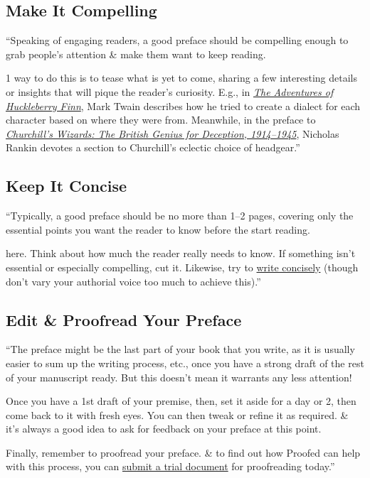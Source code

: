 \documentclass[oneside]{book}
\numberwithin{equation}{section}
\begin{document}
\subsection{Make It Compelling}
``Speaking of engaging readers, a good preface should be compelling enough to grab people's attention \& make them want to keep reading.

1 way to do this is to tease what is yet to come, sharing a few interesting details or insights that will pique the reader's curiosity. E.g., in \href{https://www.britannica.com/topic/Adventures-of-Huckleberry-Finn-novel-by-Twain}{\textit{The Adventures of Huckleberry Finn}}, Mark Twain describes how he tried to create a dialect for each character based on where they were from. Meanwhile, in the preface to \href{https://www.amazon.co.uk/dp/B002RI90B8/ref=dp-kindle-redirect?_encoding=UTF8&btkr=1}{\textit{Churchill's Wizards: The British Genius for Deception, 1914--1945}}, Nicholas Rankin devotes a section to Churchill's eclectic choice of headgear.''

\subsection{Keep It Concise}
``Typically, a good preface should be no more than 1--2 pages, covering only the essential points you want the reader to know before the start reading.

 here. Think about how much the reader really needs to know. If something isn't essential or especially compelling, cut it. Likewise, try to \href{https://proofed.co.uk/writing-tips/how-to-write-concisely/}{write concisely} (though don't vary your authorial voice too much to achieve this).''

\subsection{Edit \& Proofread Your Preface}
``The preface might be the last part of your book that you write, as it is usually easier to sum up the writing process, etc., once you have a strong draft of the rest of your manuscript ready. But this doesn't mean it warrants any less attention!

Once you have a 1st draft of your premise, then, set it aside for a day or 2, then come back to it with fresh eyes. You can then tweak or refine it as required. \& it's always a good idea to ask for feedback on your preface at this point.

Finally, remember to proofread your preface. \& to find out how Proofed can help with this process, you can \href{https://proofed.co.uk/author/book-editing-and-proofreading/}{submit a trial document} for proofreading today.''
\end{document}

